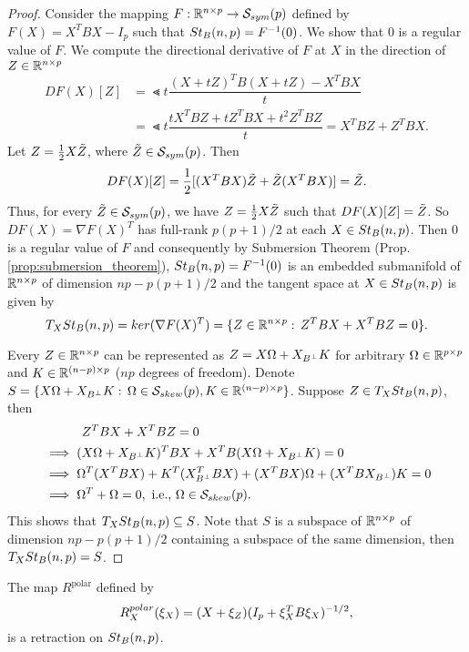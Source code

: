 \documentclass[11pt,a4paper]{article}
\begin{document}
\begin{proof}
Consider the mapping $F:\mathbb{R}^{n\times p}\rightarrow \mathcal{S}_{sym}(p)$ defined by $F(X) = X^TBX - I_p$ such that $St_B(n,p) = F^{-1}(0)$. We show that $0$ is a regular value of $F$. We compute the directional derivative of $F$ at $X$ in the direction of $Z\in\mathbb{R}^{n\times p}$
\begin{align*}
DF(X)[Z] &= \Lt{t} \dfrac{(X+tZ)^TB(X+tZ)-X^TBX}{t} \\
&= \Lt{t} \dfrac{tX^TBZ+tZ^TBX + t^2Z^TBZ}{t} = X^TBZ+Z^TBX.
\end{align*}
Let $Z = \frac{1}{2}X\Tilde{Z}$, where $\Tilde{Z}\in \mathcal{S}_{sym}(p)$. Then 
\begin{equation*}
DF(X)[Z] = \frac{1}{2}[(X^TBX)\Tilde{Z} + \Tilde{Z}(X^TBX)] = \Tilde{Z}.
\end{equation*}
Thus, for every $\Tilde{Z}\in\mathcal{S}_{sym}(p)$, we have $Z = \frac{1}{2}X\Tilde{Z}$ such that $DF(X)[Z] = \Tilde{Z}$. So $DF(X) = \nabla F(X)^T$ has full-rank $p(p+1)/2$ at each $X\in St_B(n,p)$. Then $0$ is a regular value of $F$ and consequently by Submersion Theorem (Prop. \ref{prop:submersion_theorem}), $St_B(n,p) = F^{-1}(0)$ is an embedded submanifold of $\mathbb{R}^{n\times p}$ of dimension $np-p(p+1)/2$ and the tangent space at $X\in St_B(n,p)$ is given by
\begin{equation*}
T_XSt_B(n,p) = ker(\nabla F(X)^T) = \{Z\in\mathbb{R}^{n\times p}:\,Z^TBX + X^TBZ = 0\}.
\end{equation*}

Every $Z\in\mathbb{R}^{n\times p}$ can be represented as $Z = X\Omega+X_{B^\perp} K$ for arbitrary $\Omega\in\mathbb{R}^{p\times p}$ and $K\in\mathbb{R}^{(n-p)\times p}$ ($np$ degrees of freedom). Denote $S = \{X\Omega + X_{B^\perp} K:\, \Omega \in \mathcal{S}_{skew}(p),K\in\mathbb{R}^{(n-p)\times p}\}$. Suppose $Z\in T_XSt_B(n,p)$, then 
\begin{align*}
&\;\hspace{1cm} Z^TBX + X^TBZ = 0 \\
&\implies (X\Omega+X_{B^\perp} K)^TBX + X^TB(X\Omega+X_{B^\perp} K) = 0 \\
&\implies \Omega^T(X^TBX) + K^T(X_{B^\perp}^TBX) + (X^TBX)\Omega + (X^TBX_{B^\perp}) K = 0 \\
&\implies \Omega^T + \Omega = 0, \text{ i.e., }\Omega\in\mathcal{S}_{skew}(p).
\end{align*}
This shows that $T_XSt_B(n,p)\subseteq S$. Note that $S$ is a subspace of $\mathbb{R}^{n\times p}$ of dimension $np-p(p+1)/2$ containing a subspace of the same dimension, then $T_XSt_B(n,p) = S$.
\end{proof}

\begin{prop}
The map $R^{\text{polar}}$ defined by 
\begin{equation}
R^{polar}_X(\xi_X) = (X+\xi_Z)(I_p + \xi_X^TB\xi_X)^{-1/2},
\end{equation}
is a retraction on $St_B(n,p)$.
\end{prop}
\end{document}
